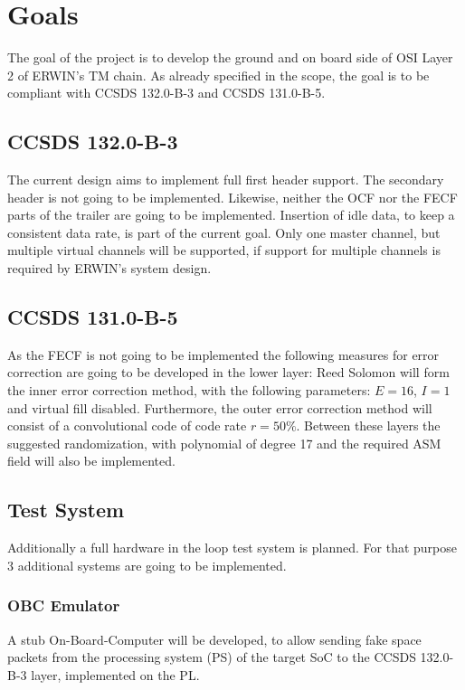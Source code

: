 \chapter{Goals}

The goal of the project is to develop the ground and on board side of OSI Layer 2 of ERWIN’s TM chain. As already specified in the scope, the goal is to be compliant with CCSDS 132.0-B-3 and CCSDS 131.0-B-5.

\section{CCSDS 132.0-B-3}

The current design aims to implement full first header support. The secondary header is not going to be implemented. Likewise, neither the OCF nor the FECF parts of the trailer are going to be implemented. Insertion of idle data, to keep a consistent data rate, is part of the current goal. Only one master channel, but multiple virtual channels will be supported, if support for multiple channels is required by ERWIN’s system design.

\section{CCSDS 131.0-B-5}

As the FECF is not going to be implemented the following measures for error correction are going  to be developed in the lower layer: Reed Solomon will form the inner error correction method, with the following parameters: $E=16$, $I=1$ and virtual fill disabled. Furthermore, the outer error correction method will consist of a convolutional code of code rate $r = 50\%$. Between these layers the suggested randomization, with polynomial of degree 17 and the required ASM field will also be implemented.

\section{Test System}

Additionally a full hardware in the loop test system is planned. For that purpose 3 additional systems are going to be implemented.

\subsection{OBC Emulator}

A stub On-Board-Computer will be developed, to allow sending fake space packets from the processing system (PS) of the target SoC to the CCSDS 132.0-B-3 layer, implemented on the PL. 

